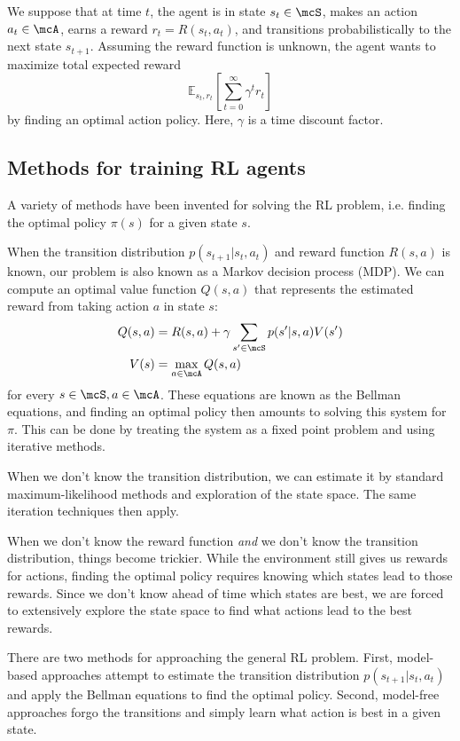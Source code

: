 \documentclass[11pt]{report}
\begin{document}
We suppose that at time $t$, the agent is in state $s_t \in \mcS$, makes an action $a_t \in \mcA$, earns a reward $r_t = R(s_t, a_t)$, and transitions probabilistically to the next state $s_{t+1}$.
Assuming the reward function is unknown, the agent wants to maximize total expected reward
$$\mathbb{E}_{s_t, r_t} [\sum_{t=0}^\infty \gamma^t r_t]$$
by finding an optimal action policy. Here, $\gamma$ is a time discount factor.


\subsection{Methods for training RL agents}

A variety of methods have been invented for solving the RL problem, i.e. finding the optimal policy $\pi(s)$ for a given state $s$.

When the transition distribution $p(s_{t+1} | s_t, a_t)$ and reward function $R(s,a)$ is known, our problem is also known as a Markov decision process (MDP). We can compute an optimal value function $Q(s, a)$ that represents the estimated reward from taking action $a$ in state $s$:
\begin{align}
Q(s, a) & = R(s, a) + \gamma \sum_{s' \in \mcS} p(s' | s, a) V(s') \\
V(s) &= \max_{a \in \mcA} Q(s,a)
\end{align}
for every $s \in \mcS, a \in \mcA$. These equations are known as the Bellman equations, and finding an optimal policy then amounts to solving this system for $\pi$. This can be done by treating the system as a fixed point problem and using iterative methods. %

When we don't know the transition distribution, we can estimate it by standard maximum-likelihood methods and exploration of the state space. The same iteration techniques then apply.

When we don't know the reward function \emph{and} we don't know the transition distribution, things become trickier. While the environment still gives us rewards for actions, finding the optimal policy requires knowing which states lead to those rewards.
Since we don't know ahead of time which states are best, we are forced to extensively explore the state space to find what actions lead to the best rewards.

There are two methods for approaching the general RL problem. First, model-based approaches attempt to estimate the transition distribution $p(s_{t+1} | s_t, a_t)$ and apply the Bellman equations to find the optimal policy. Second, model-free approaches forgo the transitions and simply learn what action is best in a given state.
\end{document}
